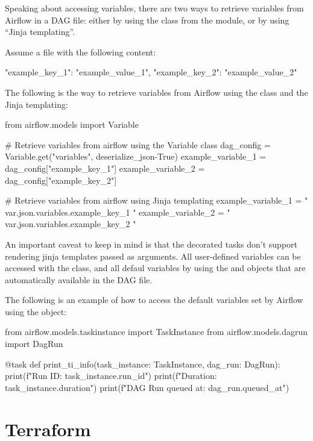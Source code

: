 Speaking about accessing variables, there are two ways to retrieve variables from Airflow in a DAG file: either by using
the  class from the  module, or by using ``Jinja templating''.

\be
Assume a  file with the following content:
\begin{block}
{
    "example_key_1": "example_value_1",
    "example_key_2": "example_value_2"
}
\end{block}

The following is the way to retrieve variables from Airflow using the  class and the Jinja templating:
\begin{block}
from airflow.models import Variable

# Retrieve variables from airflow using the Variable class
dag_config = Variable.get("variables", deserialize_json-True)
example_variable_1 = dag_config["example_key_1"]
example_variable_2 = dag_config["example_key_2"]

# Retrieve variables from airflow using Jinja templating
example_variable_1 = "{{ var.json.variables.example_key_1 }}"
example_variable_2 = "{{ var.json.variables.example_key_2 }}"
\end{block}
\ee

An important caveat to keep in mind is that the  decorated tasks don't support rendering jinja templates
passed as arguments. All user-defined variables can be accessed with the  class, and all defaul variables
by using the  and  objects that are automatically available in the DAG file.

\be
The following is an example of how to access the default variables set by Airflow using the  object:
\begin{block}
from airflow.models.taskinstance import TaskInstance
from airflow.models.dagrun import DagRun

@task
def print_ti_info(task_instance: TaskInstance, dag_run: DagRun):
    print(f"Run ID: {task_instance.run_id}")
    print(f"Duration: {task_instance.duration}")
    print(f"DAG Run queued at: {dag_run.queued_at}")
\end{block}
\ee

\newpage

\section{Terraform}

